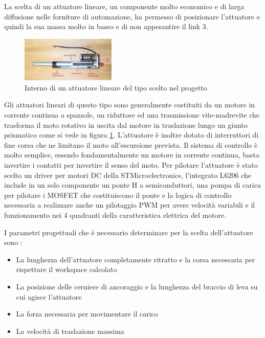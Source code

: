 \documentclass[%
corpo=11pt,
twoside,
 stile=classica,
oldstyle,
greek,%
]{toptesi}
\begin{document}
	La scelta di un attuatore lineare, un componente molto economico e di larga diffusione nelle forniture di automazione, ha permesso di posizionare l'attuatore e quindi la sua massa molto in basso e di non appesantire il link 3. 
		\begin{figure}
		\centering
		\includegraphics[width=0.4\textwidth]{image/linearact.jpg}
		\caption{Interno di un attuatore lineare del tipo scelto nel progetto }
		\label{fig:linearact}
	\end{figure}
	Gli attuatori lineari di questo tipo sono generalmente costituiti da un motore in corrente continua a spazzole, un riduttore ed una trasmissione vite-madrevite che trasforma il moto rotativo in uscita dal motore in traslazione lungo un giunto prismatico come si vede in figura \ref{fig:linearact}.
	L'attuatore è inoltre dotato di interruttori di fine corsa che ne limitano il moto all'escursione prevista. Il sistema di controllo è molto semplice, essendo fondamentalmente un motore in corrente continua, basta invertire i contatti per invertire il senso del moto. 
	Per pilotare l'attuatore è stato scelto un driver per motori DC della STMicroelectronics, l'integrato L6206 che include in un solo componente un ponte H a semiconduttori, una pompa di carica per pilotare i MOSFET che costituiscono il ponte e la logica di controllo necessaria a realizzare anche un pilotaggio PWM per avere velocità variabili e il funzionamento nei 4 quadranti della caratteristica elettrica del motore. 
	
	I parametri progettuali che è necessario determinare per la scelta dell'attuatore sono :
	\begin{itemize}
		\item La lunghezza dell'attuatore completamente ritratto e la corsa necessaria per rispettare il workspace calcolato
		\item La posizione delle cerniere di ancoraggio e la lunghezza del braccio di leva su cui agisce l'attuatore
		\item La forza necessaria per movimentare il carico 
		\item La velocità di traslazione massima 
	\end{itemize}
	
\end{document}
